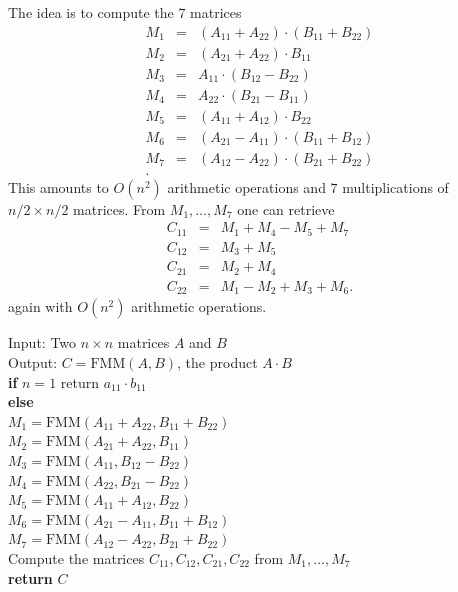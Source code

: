 The idea is to compute the $7$ matrices
\begin{eqnarray*}
  M_1 & = & (A_{11} + A_{22}) \cdot (B_{11}+ B_{22}) \\
  M_2 & = & (A_{21} + A_{22}) \cdot B_{11} \\
  M_3 & = & A_{11} \cdot (B_{12} - B_{22}) \\
  M_4 & = & A_{22} \cdot (B_{21} - B_{11}) \\
  M_5 & = & (A_{11} + A_{12})\cdot B_{22} \\
  M_6 & = & (A_{21}-A_{11}) \cdot (B_{11}+B_{12}) \\
  M_7 & = & (A_{12}-A_{22}) \cdot  (B_{21} + B_{22})\\. 
\end{eqnarray*}
This amounts to $O(n^2)$ arithmetic operations and $7$ multiplications of $n/2 × n/2$ matrices. From $M_1,\dots,M_7$ one can retrieve 
\begin{eqnarray*}
C_{11} & = & M_1 + M_4 - M_5 + M_7\\
C_{12} & = & M_3 + M_5 \\
C_{21} & = & M_2 + M_4\\
C_{22} & = & M_1 - M_2 + M_3 + M_6.  
\end{eqnarray*}
again with $O(n^2)$ arithmetic operations. 


\begin{algorithm}

  \begin{tabbing}
    Input: Two $n ×n$ matrices $A$ and $B$ \\
    Output: $C = \mathrm{FMM}(A,B)$, the product $ A\cdot B$ \\

    {\bf if}  $n=1$ return $a_{11} ⋅b_{11}$ \\
    {\bf else} \=  \\
               \>  $M_1 = \mathrm{FMM} (A_{11} + A_{22} , B_{11}+ B_{22}) $ \\
               \> $M_2 = \mathrm{FMM}(A_{21} + A_{22},  B_{11})$ \\
               \> $M_3  = \mathrm{FMM} (A_{11} , B_{12} - B_{22}) $\\
               \> $M_4  = \mathrm{FMM}( A_{22} , B_{21} - B_{22})$ \\
               \> $M_5  = \mathrm{FMM}(A_{11} + A_{12}, B_{22})$ \\
               \> $M_6  = \mathrm{FMM} (A_{21}-A_{11}, B_{11}+B_{12}) $\\
               \> $M_7  = \mathrm{FMM} (A_{12}-A_{22}, B_{21} + B_{22})$\\ 
               \> Compute the matrices $C_{11}, C_{12}, C_{21}, C_{22}$ from $M_1,\dots,M_7$ \\
               \> {\bf return} $C$
  \end{tabbing}
\end{algorithm}

